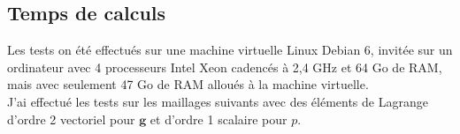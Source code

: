 


\subsection{Temps de calculs}
Les tests on été effectués sur une machine virtuelle Linux Debian 6, invitée sur un ordinateur avec 4 processeurs Intel Xeon cadencés à 2,4 GHz et 64 Go de RAM, mais avec seulement 47 Go de RAM alloués à la machine virtuelle.\\

J'ai effectué les tests sur les maillages suivants avec des éléments de Lagrange d'ordre 2 vectoriel pour $\mathbf{g}$ et d'ordre 1 scalaire pour $p$. \\

